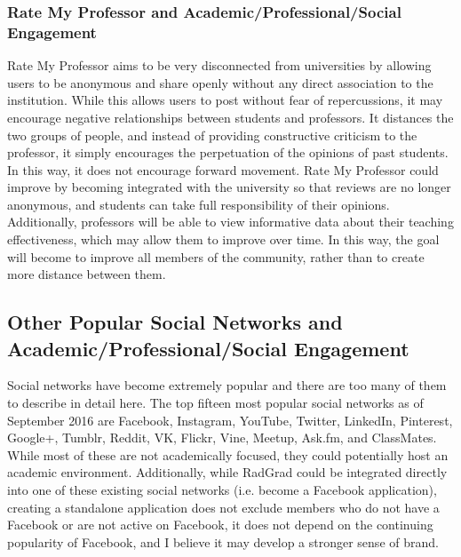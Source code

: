 \subsubsection{Rate My Professor and Academic/Professional/Social Engagement}
Rate My Professor aims to be very disconnected from universities by allowing users to be anonymous and share openly without any direct association to the institution. While this allows users to post without fear of repercussions, it may encourage negative relationships between students and professors. It distances the two groups of people, and instead of providing constructive criticism to the professor, it simply encourages the perpetuation of the opinions of past students. In this way, it does not encourage forward movement. Rate My Professor could improve by becoming integrated with the university so that reviews are no longer anonymous, and students can take full responsibility of their opinions. Additionally, professors will be able to view informative data about their teaching effectiveness, which may allow them to improve over time. In this way, the goal will become to improve all members of the community, rather than to create more distance between them.

\subsection{Other Popular Social Networks and Academic/Professional/Social Engagement}
Social networks have become extremely popular and there are too many of them to describe in detail here. The top fifteen most popular social networks as of September 2016 are Facebook, Instagram, YouTube, Twitter, LinkedIn, Pinterest, Google+, Tumblr, Reddit, VK, Flickr, Vine, Meetup, Ask.fm, and ClassMates. While most of these are not academically focused, they could potentially host an academic environment. Additionally, while RadGrad could be integrated directly into one of these existing social networks (i.e. become a Facebook application), creating a standalone application does not exclude members who do not have a Facebook or are not active on Facebook, it does not depend on the continuing popularity of Facebook, and I believe it may develop a stronger sense of brand. 

